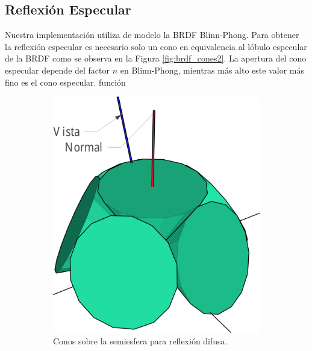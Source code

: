 \subsection{Reflexión Especular}
Nuestra implementación utiliza de modelo la \ac{BRDF} Blinn-Phong. Para obtener la reflexión especular es necesario solo un cono en equivalencia al lóbulo especular de la \ac{BRDF} como se observa en la Figura \ref{fig:brdf_cones2}. La apertura del cono especular depende del factor $n$ en Blinn-Phong, mientras más alto este valor más fino es el cono especular.
función
\begin{figure}[H]
	\centering
	\begin{subfigure}[t]{.32\linewidth}
		\centering
		\captionsetup{justification=centering}
		\includegraphics[width=\linewidth]{media/diffuse_cones_cropped.pdf}
		\caption*{Conos sobre la semiesfera para reflexión difusa.}
	\end{subfigure}%
	\hspace{0.01\textwidth}
	\begin{subfigure}[t]{.32\linewidth}
		\centering
		\captionsetup{justification=centering}

\end{subfigure}
\end{figure}
